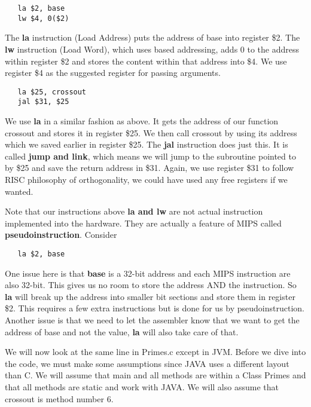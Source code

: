 \documentclass[11pt]{article}
\begin{document}
\begin{verbatim}
   la $2, base
   lw $4, 0($2)
\end{verbatim}

The {\bf la} instruction (Load Address) puts the address of base into register \$2. The {\bf lw} instruction (Load Word), which uses based addressing, adds 0 to the address within register \$2 and stores the content within that address into \$4. We use register \$4 as the suggested register for passing arguments.

\begin{verbatim}
   la $25, crossout
   jal $31, $25
\end{verbatim}

We use {\bf la} in a similar fashion as above. It gets the address of our function crossout and stores it in register \$25. We then call crossout by using its address which we saved earlier in register \$25. The {\bf jal} instruction does just this. It is called {\bf jump and link}, which means we will jump to the subroutine pointed to by \$25 and save the return address in \$31. Again, we use register \$31 to follow RISC philosophy of orthogonality, we could have used any free registers if we wanted.

Note that our instructions above {\bf la and lw} are not actual instruction implemented into the hardware. They are actually a feature of MIPS called {\bf pseudoinstruction}. Consider 

\begin{verbatim}
   la $2, base
\end{verbatim}

One issue here is that {\bf base} is a 32-bit address and each MIPS instruction are also 32-bit. This gives us no room to store the address AND the instruction. So {\bf la} will break up the address into smaller bit sections and store them in register \$2. This requires a few extra instructions but is done for us by pseudoinstruction. Another issue is that we need to let the assembler know that we want to get the address of base and not the value, {\bf la} will also take care of that.


We will now look at the same line in Primes.c except in JVM. Before we dive into the code, we must make some assumptions since JAVA uses a different layout than C. We will assume that main and all methods are within a Class Primes and that all methods are static and work with JAVA. We will also assume that crossout is method number 6.
\end{document}

